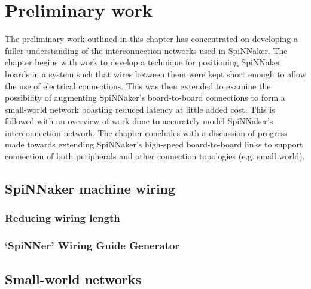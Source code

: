 \chapter{Preliminary work}
	\label{sec:preliminary-work}
	
	
	The preliminary work outlined in this chapter has concentrated on developing a
	fuller understanding of the interconnection networks used in SpiNNaker. The
	chapter begins with work to develop a technique for positioning SpiNNaker
	boards in a system such that wires between them were kept short enough to
	allow the use of electrical connections. This was then extended to examine the
	possibility of augmenting SpiNNaker's board-to-board connections to form a
	small-world network boasting reduced latency at little added cost. This is
	followed with an overview of work done to accurately model SpiNNaker's
	interconnection network. The chapter concludes with a discussion of progress
	made towards extending SpiNNaker's high-speed board-to-board links to support
	connection of both peripherals and other connection topologies (e.g. small
	world).
	
	\section{SpiNNaker machine wiring}
		
		
		\subsection{Reducing wiring length}
			
		
		\subsection{`SpiNNer' Wiring Guide Generator}
			
	
	
	\section{Small-world networks}
		
